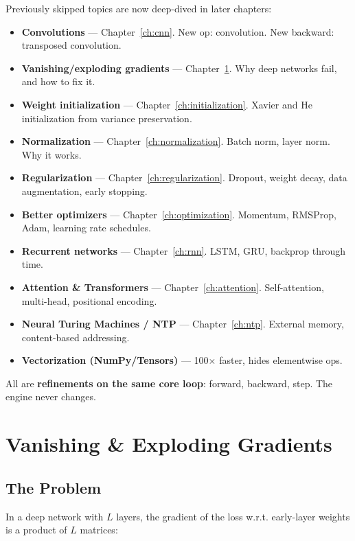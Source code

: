 \documentclass[11pt,a4paper]{book}
\begin{document}
Previously skipped topics are now deep-dived in later chapters:
\begin{itemize}[leftmargin=*]
    \item \textbf{Convolutions} --- Chapter~\ref{ch:cnn}. New op: convolution. New backward: transposed convolution.
    \item \textbf{Vanishing/exploding gradients} --- Chapter~\ref{ch:vanishing}. Why deep networks fail, and how to fix it.
    \item \textbf{Weight initialization} --- Chapter~\ref{ch:initialization}. Xavier and He initialization from variance preservation.
    \item \textbf{Normalization} --- Chapter~\ref{ch:normalization}. Batch norm, layer norm. Why it works.
    \item \textbf{Regularization} --- Chapter~\ref{ch:regularization}. Dropout, weight decay, data augmentation, early stopping.
    \item \textbf{Better optimizers} --- Chapter~\ref{ch:optimization}. Momentum, RMSProp, Adam, learning rate schedules.
    \item \textbf{Recurrent networks} --- Chapter~\ref{ch:rnn}. LSTM, GRU, backprop through time.
    \item \textbf{Attention \& Transformers} --- Chapter~\ref{ch:attention}. Self-attention, multi-head, positional encoding.
    \item \textbf{Neural Turing Machines / NTP} --- Chapter~\ref{ch:ntp}. External memory, content-based addressing.
    \item \textbf{Vectorization (NumPy/Tensors)} --- 100$\times$ faster, hides elementwise ops.
\end{itemize}
All are \textbf{refinements on the same core loop}: forward, backward, step. The engine never changes.
\clearpage

\chapter{Vanishing \& Exploding Gradients}\label{ch:vanishing}

\section{The Problem}

In a deep network with $L$ layers, the gradient of the loss w.r.t. early-layer weights is a product of $L$ matrices:
\end{document}
